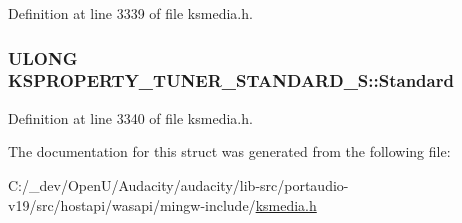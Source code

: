 Definition at line 3339 of file ksmedia.\+h.

\subsubsection[{\texorpdfstring{Standard}{Standard}}]{\setlength{\rightskip}{0pt plus 5cm}U\+L\+O\+NG K\+S\+P\+R\+O\+P\+E\+R\+T\+Y\+\_\+\+T\+U\+N\+E\+R\+\_\+\+S\+T\+A\+N\+D\+A\+R\+D\+\_\+\+S\+::\+Standard}\hypertarget{struct_k_s_p_r_o_p_e_r_t_y___t_u_n_e_r___s_t_a_n_d_a_r_d___s_aed809b48e08f59d846d855f105d3b4df}{}\label{struct_k_s_p_r_o_p_e_r_t_y___t_u_n_e_r___s_t_a_n_d_a_r_d___s_aed809b48e08f59d846d855f105d3b4df}


Definition at line 3340 of file ksmedia.\+h.



The documentation for this struct was generated from the following file\+:\begin{DoxyCompactItemize}
\item 
C\+:/\+\_\+dev/\+Open\+U/\+Audacity/audacity/lib-\/src/portaudio-\/v19/src/hostapi/wasapi/mingw-\/include/\hyperlink{ksmedia_8h}{ksmedia.\+h}\end{DoxyCompactItemize}
